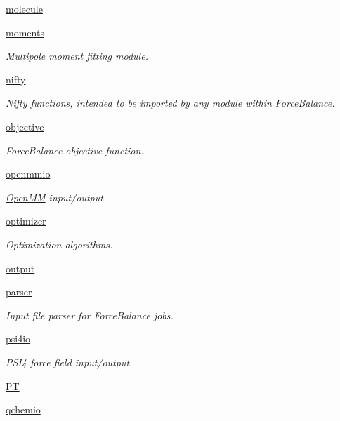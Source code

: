 \begin{DoxyCompactItemize}
\hyperlink{namespaceforcebalance_1_1molecule}{molecule}
\item 
\hyperlink{namespaceforcebalance_1_1moments}{moments}
\begin{DoxyCompactList}\small\item\em Multipole moment fitting module. \end{DoxyCompactList}\item 
\hyperlink{namespaceforcebalance_1_1nifty}{nifty}
\begin{DoxyCompactList}\small\item\em Nifty functions, intended to be imported by any module within Force\-Balance. \end{DoxyCompactList}\item 
\hyperlink{namespaceforcebalance_1_1objective}{objective}
\begin{DoxyCompactList}\small\item\em Force\-Balance objective function. \end{DoxyCompactList}\item 
\hyperlink{namespaceforcebalance_1_1openmmio}{openmmio}
\begin{DoxyCompactList}\small\item\em \hyperlink{classforcebalance_1_1openmmio_1_1OpenMM}{Open\-M\-M} input/output. \end{DoxyCompactList}\item 
\hyperlink{namespaceforcebalance_1_1optimizer}{optimizer}
\begin{DoxyCompactList}\small\item\em Optimization algorithms. \end{DoxyCompactList}\item 
\hyperlink{namespaceforcebalance_1_1output}{output}
\item 
\hyperlink{namespaceforcebalance_1_1parser}{parser}
\begin{DoxyCompactList}\small\item\em Input file parser for Force\-Balance jobs. \end{DoxyCompactList}\item 
\hyperlink{namespaceforcebalance_1_1psi4io}{psi4io}
\begin{DoxyCompactList}\small\item\em P\-S\-I4 force field input/output. \end{DoxyCompactList}\item 
\hyperlink{namespaceforcebalance_1_1PT}{P\-T}
\item 
\hyperlink{namespaceforcebalance_1_1qchemio}{qchemio}

\end{DoxyCompactItemize}
